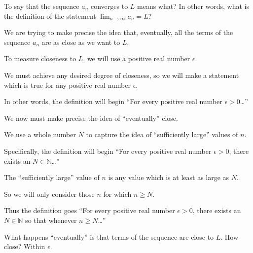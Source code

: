 \documentclass{ximera}
\begin{document}
\begin{question}
  To say that the sequence \(a_n\) converges to \(L\) means what?  In other words, what is the definition of the statement \(\displaystyle\lim_{n \to \infty} a_n = L\)?
  \begin{solution}
    \begin{hint}
      We are trying to make precise the idea that, eventually, all the terms of the sequence \(a_n\) are as close as we want to \(L\).
    \end{hint}
    \begin{hint}
      To measure closeness to \(L\), we will use a positive real number \(\epsilon\).
    \end{hint}
    \begin{hint}
      We must achieve any desired degree of closeness, so we will make a statement which is true for any positive real number \(\epsilon\).
    \end{hint}
    \begin{hint}
      In other words, the definition will begin ``For every positive real number \(\epsilon > 0\)\ldots''
    \end{hint}
    \begin{hint}
      We now must make precise the idea of ``eventually'' close.
    \end{hint}
    \begin{hint}
      We use a whole number \(N\) to capture the idea of ``sufficiently large'' values of \(n\).
    \end{hint}
    \begin{hint}
      Specifically, the definition will begin ``For every positive real number \(\epsilon > 0\), there exists an \(N \in \mathbb{N}\)\ldots''
    \end{hint}
    \begin{hint}
      The ``sufficiently large'' value of \(n\) is any value which is at least as large as \(N\).
    \end{hint}
    \begin{hint}
      So we will only consider those \(n\) for which \(n \geq N\).
    \end{hint}
    \begin{hint}
      Thus the definition goes ``For every positive real number \(\epsilon > 0\), there exists an \(N \in \mathbb{N}\) so that whenever \(n \geq N\)\ldots''
    \end{hint}
    \begin{hint}
      What happens ``eventually'' is that terms of the sequence are close to \(L\).  How close?  Within \(\epsilon\).

\end{hint}
\end{solution}
\end{question}
\end{document}
